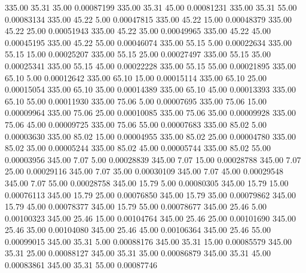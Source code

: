     335.00     35.31     35.00     0.00087199
    335.00     35.31     45.00     0.00081231
    335.00     35.31     55.00     0.00083134
    335.00     45.22      5.00     0.00047815
    335.00     45.22     15.00     0.00048379
    335.00     45.22     25.00     0.00051943
    335.00     45.22     35.00     0.00049965
    335.00     45.22     45.00     0.00045195
    335.00     45.22     55.00     0.00046074
    335.00     55.15      5.00     0.00022634
    335.00     55.15     15.00     0.00025207
    335.00     55.15     25.00     0.00027497
    335.00     55.15     35.00     0.00025341
    335.00     55.15     45.00     0.00022228
    335.00     55.15     55.00     0.00021895
    335.00     65.10      5.00     0.00012642
    335.00     65.10     15.00     0.00015114
    335.00     65.10     25.00     0.00015054
    335.00     65.10     35.00     0.00014389
    335.00     65.10     45.00     0.00013393
    335.00     65.10     55.00     0.00011930
    335.00     75.06      5.00     0.00007695
    335.00     75.06     15.00     0.00009964
    335.00     75.06     25.00     0.00010085
    335.00     75.06     35.00     0.00009928
    335.00     75.06     45.00     0.00009725
    335.00     75.06     55.00     0.00007683
    335.00     85.02      5.00     0.00003630
    335.00     85.02     15.00     0.00004955
    335.00     85.02     25.00     0.00004780
    335.00     85.02     35.00     0.00005244
    335.00     85.02     45.00     0.00005744
    335.00     85.02     55.00     0.00003956
    345.00      7.07      5.00     0.00028839
    345.00      7.07     15.00     0.00028788
    345.00      7.07     25.00     0.00029116
    345.00      7.07     35.00     0.00030109
    345.00      7.07     45.00     0.00029548
    345.00      7.07     55.00     0.00028758
    345.00     15.79      5.00     0.00080305
    345.00     15.79     15.00     0.00076113
    345.00     15.79     25.00     0.00076850
    345.00     15.79     35.00     0.00079862
    345.00     15.79     45.00     0.00078377
    345.00     15.79     55.00     0.00078677
    345.00     25.46      5.00     0.00100323
    345.00     25.46     15.00     0.00104764
    345.00     25.46     25.00     0.00101690
    345.00     25.46     35.00     0.00104080
    345.00     25.46     45.00     0.00106364
    345.00     25.46     55.00     0.00099015
    345.00     35.31      5.00     0.00088176
    345.00     35.31     15.00     0.00085579
    345.00     35.31     25.00     0.00088127
    345.00     35.31     35.00     0.00086879
    345.00     35.31     45.00     0.00083861
    345.00     35.31     55.00     0.00087746
